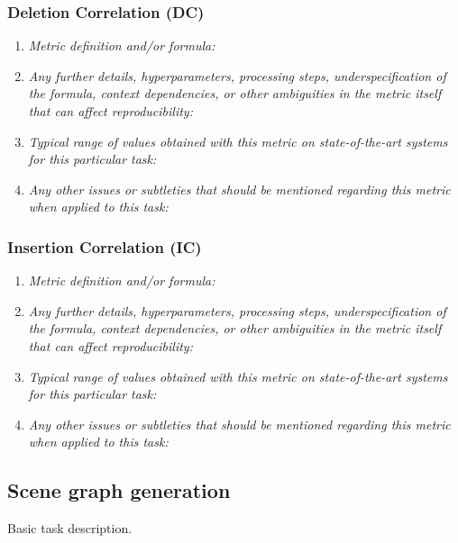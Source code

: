 \documentclass[a4paper,11pt]{article}
\begin{document}
        \subsubsection{Deletion Correlation (DC)}
            \begin{enumerate}[label=\alph*.]
                \item \textit{Metric definition and/or formula:}
                \bigskip
                \item \textit{Any further details, hyperparameters, processing steps, underspecification of the formula, context dependencies, or other ambiguities in the metric itself that can affect reproducibility:}
                \bigskip
                \item \textit{Typical range of values obtained with this metric on state-of-the-art systems for this particular task:}
                \bigskip
                \item \textit{Any other issues or subtleties that should be mentioned regarding this metric when applied to this task:}
                \bigskip
            \end{enumerate}
        \subsubsection{Insertion Correlation (IC)}
            \begin{enumerate}[label=\alph*.]
                \item \textit{Metric definition and/or formula:}
                \bigskip
                \item \textit{Any further details, hyperparameters, processing steps, underspecification of the formula, context dependencies, or other ambiguities in the metric itself that can affect reproducibility:}
                \bigskip
                \item \textit{Typical range of values obtained with this metric on state-of-the-art systems for this particular task:}
                \bigskip
                \item \textit{Any other issues or subtleties that should be mentioned regarding this metric when applied to this task:}
                \bigskip
            \end{enumerate}

    \subsection{Scene graph generation}
        Basic task description.
\end{document}
